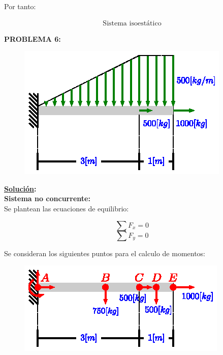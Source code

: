 \documentclass[letter,10pt,twoside]{article}
\begin{document}
Por tanto:

\begin{equation*}
\boxed{
    \begin{array}{l}
        \text{Sistema isoestático}
    \end{array}
}
\end{equation*}

\vspace{1.0cm}

\colorbox{blue!25}{\textbf{PROBLEMA 6:}}

\begin{figure}[H]
\centering
\includegraphics[scale=1.8]{resources/f06.eps}
\end{figure}

\textbf{\underline{Solución}:} \\

\textbf{Sistema no concurrente:} \\
Se plantean las ecuaciones de equilibrio:

\begin{equation*}
    \sum{F_x} = 0
\end{equation*}
\begin{equation*}
    \sum{F_y} = 0
\end{equation*}

Se consideran los siguientes puntos para el calculo de momentos:

\begin{figure}[H]
\centering
\includegraphics[scale=1.8]{resources/g06.eps}
\end{figure}
\end{document}

